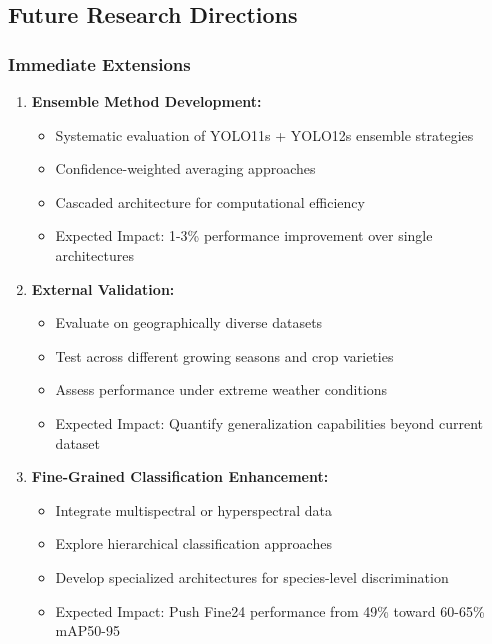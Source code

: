 \subsection{Future Research Directions}

\subsubsection{Immediate Extensions}

\begin{enumerate}
    \item \textbf{Ensemble Method Development:}
    \begin{itemize}
        \item Systematic evaluation of YOLO11s + YOLO12s ensemble strategies
        \item Confidence-weighted averaging approaches
        \item Cascaded architecture for computational efficiency
        \item Expected Impact: 1-3\% performance improvement over single architectures
    \end{itemize}
    
    \item \textbf{External Validation:}
    \begin{itemize}
        \item Evaluate on geographically diverse datasets
        \item Test across different growing seasons and crop varieties
        \item Assess performance under extreme weather conditions
        \item Expected Impact: Quantify generalization capabilities beyond current dataset
    \end{itemize}
    
    \item \textbf{Fine-Grained Classification Enhancement:}
    \begin{itemize}
        \item Integrate multispectral or hyperspectral data
        \item Explore hierarchical classification approaches
        \item Develop specialized architectures for species-level discrimination
        \item Expected Impact: Push Fine24 performance from 49\% toward 60-65\% mAP50-95
    \end{itemize}
\end{enumerate}

